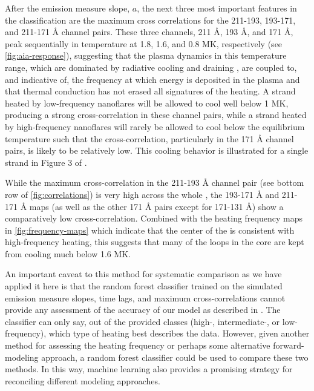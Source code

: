 After the emission measure slope, $a$, the next three most important features in the classification are the maximum cross correlations for the 211-193, 193-171, and 211-171 \AA{} channel pairs. These three channels, 211 \AA{}, 193 \AA{}, and 171 \AA{}, peak sequentially in temperature at 1.8, 1.6, and 0.8 MK, respectively (see \autoref{fig:aia-response}), suggesting that the plasma dynamics in this temperature range, which are dominated by radiative cooling and draining \citep[e.g.][]{bradshaw_cooling_2005,bradshaw_cooling_2010,bradshaw_new_2010}, are coupled to, and indicative of, the frequency at which energy is deposited in the plasma and that thermal conduction has not erased all signatures of the heating. A strand heated by low-frequency nanoflares will be allowed to cool well below 1 MK, producing a strong cross-correlation in these channel pairs, while a strand heated by high-frequency nanoflares will rarely be allowed to cool below the equilibrium temperature such that the cross-correlation, particularly in the 171 \AA{} channel pairs, is likely to be relatively low. This cooling behavior is illustrated for a single strand in Figure 3 of .

While the maximum cross-correlation in the 211-193 \AA{} channel pair (see bottom row of \autoref{fig:correlations}) is very high across the whole \AR{}, the 193-171 \AA{} and 211-171 \AA{} maps (as well as the other 171 \AA{} pairs except for 171-131 \AA{}) show a comparatively low cross-correlation. Combined with the heating frequency maps in \autoref{fig:frequency-maps} which indicate that the center of the \AR{} is consistent with high-frequency heating, this suggests that many of the loops in the core are kept from cooling much below 1.6 MK.

An important caveat to this method for systematic comparison as we have applied it here is that the random forest classifier trained on the simulated emission measure slopes, time lags, and maximum cross-correlations cannot provide any assessment of the accuracy of our model as described in . The classifier can only say, out of the provided classes (high-, intermediate-, or low-frequency), which type of heating best describes the data. However, given another method for assessing the heating frequency or perhaps some alternative forward-modeling approach, a random forest classifier could be used to compare these two methods. In this way, machine learning also provides a promising strategy for reconciling different modeling approaches.
